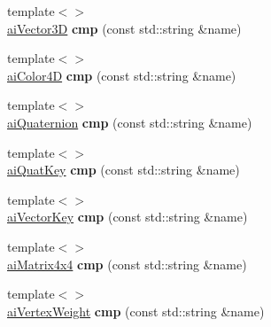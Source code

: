 \begin{DoxyCompactItemize}
\item 
\hypertarget{classcomparer__context_ab5918d8552beefc17b73dddc889bc21c}{{\footnotesize template$<$$>$ }\\\hyperlink{structai_vector3_d}{ai\+Vector3\+D} {\bfseries cmp} (const std\+::string \&name)}\label{classcomparer__context_ab5918d8552beefc17b73dddc889bc21c}

\item 
\hypertarget{classcomparer__context_ac1881eb95c93e4076fe874d19cbbcf5b}{{\footnotesize template$<$$>$ }\\\hyperlink{structai_color4_d}{ai\+Color4\+D} {\bfseries cmp} (const std\+::string \&name)}\label{classcomparer__context_ac1881eb95c93e4076fe874d19cbbcf5b}

\item 
\hypertarget{classcomparer__context_a08b5abee3369559bf2514d6dc1939d55}{{\footnotesize template$<$$>$ }\\\hyperlink{structai_quaternion}{ai\+Quaternion} {\bfseries cmp} (const std\+::string \&name)}\label{classcomparer__context_a08b5abee3369559bf2514d6dc1939d55}

\item 
\hypertarget{classcomparer__context_a585e63a9d2096fb4107989b57f093c4d}{{\footnotesize template$<$$>$ }\\\hyperlink{structai_quat_key}{ai\+Quat\+Key} {\bfseries cmp} (const std\+::string \&name)}\label{classcomparer__context_a585e63a9d2096fb4107989b57f093c4d}

\item 
\hypertarget{classcomparer__context_ac67450e7294c73ee382d53c827fee662}{{\footnotesize template$<$$>$ }\\\hyperlink{structai_vector_key}{ai\+Vector\+Key} {\bfseries cmp} (const std\+::string \&name)}\label{classcomparer__context_ac67450e7294c73ee382d53c827fee662}

\item 
\hypertarget{classcomparer__context_a6f55749d787796dd83958d6e931484c7}{{\footnotesize template$<$$>$ }\\\hyperlink{structai_matrix4x4}{ai\+Matrix4x4} {\bfseries cmp} (const std\+::string \&name)}\label{classcomparer__context_a6f55749d787796dd83958d6e931484c7}

\item 
\hypertarget{classcomparer__context_ac6f1440d409277da19e5d3d3b6f47393}{{\footnotesize template$<$$>$ }\\\hyperlink{structai_vertex_weight}{ai\+Vertex\+Weight} {\bfseries cmp} (const std\+::string \&name)}\label{classcomparer__context_ac6f1440d409277da19e5d3d3b6f47393}

\end{DoxyCompactItemize}
